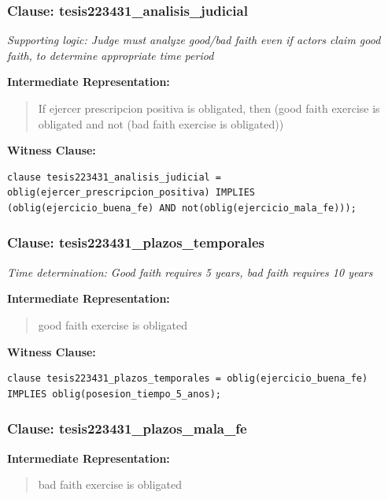 \documentclass[11pt,a4paper]{article}
\begin{document}
\subsubsection{Clause: tesis223431\_analisis\_judicial}

\textit{Supporting logic: Judge must analyze good/bad faith even if actors claim good faith, to determine appropriate time period}

\textbf{Intermediate Representation:}

\begin{quote}
If ejercer prescripcion positiva is obligated, then (good faith exercise is obligated and not (bad faith exercise is obligated))
\end{quote}

\textbf{Witness Clause:}

\begin{lstlisting}[style=witnessstyle, language=Witness]
clause tesis223431_analisis_judicial = oblig(ejercer_prescripcion_positiva) IMPLIES (oblig(ejercicio_buena_fe) AND not(oblig(ejercicio_mala_fe)));
\end{lstlisting}

\subsubsection{Clause: tesis223431\_plazos\_temporales}

\textit{Time determination: Good faith requires 5 years, bad faith requires 10 years}

\textbf{Intermediate Representation:}

\begin{quote}
good faith exercise is obligated
\end{quote}

\textbf{Witness Clause:}

\begin{lstlisting}[style=witnessstyle, language=Witness]
clause tesis223431_plazos_temporales = oblig(ejercicio_buena_fe) IMPLIES oblig(posesion_tiempo_5_anos);
\end{lstlisting}

\subsubsection{Clause: tesis223431\_plazos\_mala\_fe}

\textbf{Intermediate Representation:}

\begin{quote}
bad faith exercise is obligated
\end{quote}
\end{document}
